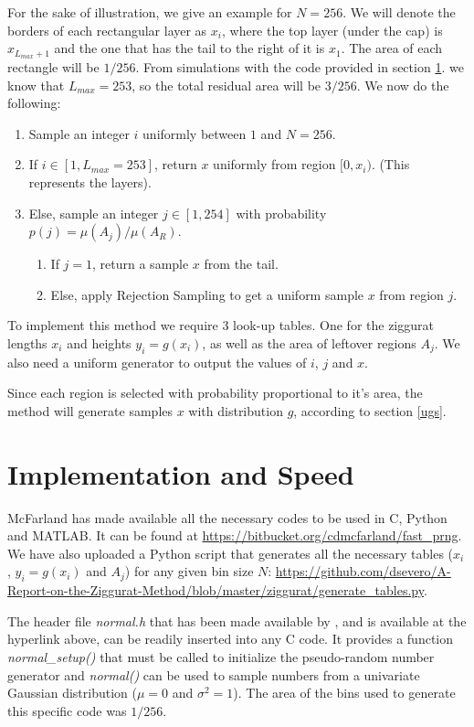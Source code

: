 \documentclass[11pt,onecolumn]{article}
\let\oldref\ref%
\def\ref{\oldref*}}
\begin{document}
For the sake of illustration, we give an example for $N=256$. We will denote the borders of each rectangular layer as $x_i$, where the top layer (under the cap) is $x_{L_{max}+1}$ and the one that has the tail to the right of it is $x_1$. The area of each rectangle will be $1/256$. From simulations with the code provided in section \ref{implementation}. we know that $L_{max}=253$, so the total residual area will be $3/256$. We now do the following:
\begin{enumerate}
	\item Sample an integer $i$ uniformly between $1$ and $N=256$.
	\item If $i\in[1,L_{max}=253]$, return $x$ uniformly from region $[0,x_i)$. (This represents the layers).
	\item Else, sample an integer $j\in[1,254]$ with probability $p(j)=\mu(A_j)/\mu(A_R)$.
	\begin{enumerate}
		\item If $j=1$, return a sample $x$ from the tail.
		\item Else, apply Rejection Sampling to get a uniform sample $x$ from region $j$.
	\end{enumerate}
\end{enumerate}

To implement this method we require 3 look-up tables. One for the ziggurat lengths $x_i$ and heights $y_i=g(x_i)$, as well as the area of leftover regions $A_j$. We also need a uniform generator to output the values of $i$, $j$ and $x$.

Since each region is selected with probability proportional to it's area, the method will generate samples $x$ with distribution $g$, according to section \ref{ugs}.

\section{Implementation and Speed}\label{implementation}
McFarland \cite{mcfarland} has made available all the necessary codes to be used in C, Python and MATLAB. It can be found at \url{https://bitbucket.org/cdmcfarland/fast_prng}. We have also uploaded a Python script that generates all the necessary tables ($x_i$, $y_i=g(x_i)$ and $A_j$) for any given bin size $N$: \url{https://github.com/dsevero/A-Report-on-the-Ziggurat-Method/blob/master/ziggurat/generate_tables.py}.

The header file \textit{normal.h} that has been made available by \cite{mcfarland}, and 
is available at the hyperlink above, can be readily inserted into any C code. It provides 
a function \textit{normal\_setup()} that must be called to initialize the pseudo-random
number generator and \textit{normal()} can be used to sample numbers from a univariate
Gaussian distribution ($\mu=0$ and $\sigma^2=1$). The area of the bins used to generate this specific code was $1/256$.
\end{document}
